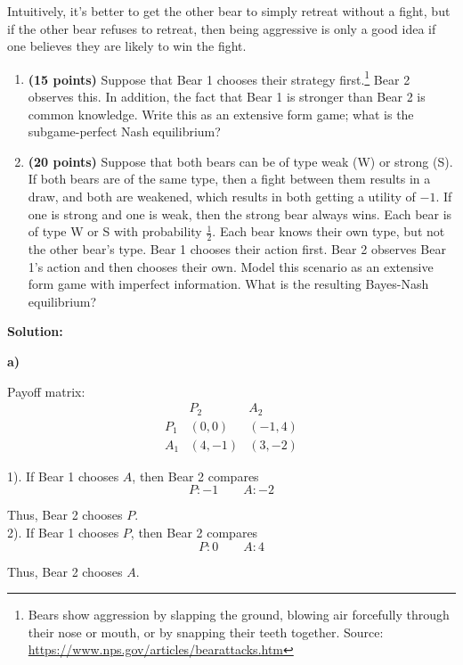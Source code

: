 \documentclass[11pt]{article}
\begin{document}
\begin{enumerate}[label=\textbf{\arabic*.}, leftmargin=*]
Intuitively, it's better to get the other bear to simply retreat without a fight, but if the other bear refuses to retreat, then being aggressive is only a good idea if one believes they are likely to win the fight.

\begin{enumerate}[label=(\alph*)]
    \item \textbf{(15 points)} Suppose that Bear 1 chooses their strategy first.\footnote{Bears show aggression by slapping the ground, blowing air forcefully through their nose or mouth, or by snapping their teeth together. Source: \url{https://www.nps.gov/articles/bearattacks.htm}} Bear 2 observes this. In addition, the fact that Bear 1 is stronger than Bear 2 is common knowledge. Write this as an extensive form game; what is the subgame-perfect Nash equilibrium?

    \item \textbf{(20 points)} Suppose that both bears can be of type weak (W) or strong (S). If both bears are of the same type, then a fight between them results in a draw, and both are weakened, which results in both getting a utility of $-1$. If one is strong and one is weak, then the strong bear always wins. Each bear is of type W or S with probability $\frac{1}{2}$. Each bear knows their own type, but not the other bear's type. Bear 1 chooses their action first. Bear 2 observes Bear 1's action and then chooses their own. Model this scenario as an extensive form game with imperfect information. What is the resulting Bayes-Nash equilibrium?
\end{enumerate}

\end{enumerate}

\textbf{Solution:}

\textbf{a)}

Payoff matrix:
\[
\begin{array}{c|cc}
 & P_2 & A_2\\
\hline
P_1 & (0,0) & (-1,4)\\
A_1 & (4,-1) & (3,-2)
\end{array}
\]

1). If Bear 1 chooses \(A\), then Bear 2 compares
\[
P: -1 \qquad
A: -2
\]

Thus, Bear 2 chooses \(P\).\\

2). If Bear 1 chooses \(P\), then Bear 2 compares
\[
P: 0 \qquad 
A: 4
\]

Thus, Bear 2 chooses \(A\).\\
\end{document}
